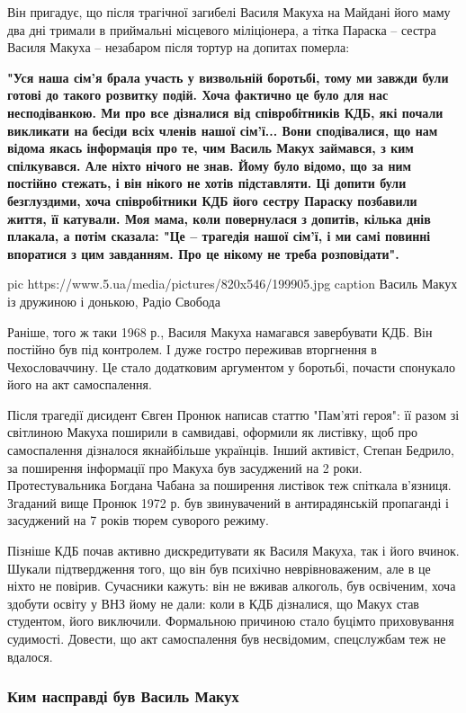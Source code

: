 Він пригадує, що після трагічної загибелі Василя Макуха на Майдані його
маму два дні тримали в приймальні місцевого міліціонера, а тітка Параска –
сестра Василя Макуха – незабаром після тортур на допитах померла:

{\bfseries
"Уся наша сім'я брала участь у визвольній боротьбі, тому ми завжди були
готові до такого розвитку подій. Хоча фактично це було для нас
несподіванкою. Ми про все дізналися від співробітників КДБ, які почали
викликати на бесіди всіх членів нашої сім'ї... Вони сподівалися, що нам
відома якась інформація про те, чим Василь Макух займався, з ким
спілкувався. Але ніхто нічого не знав. Йому було відомо, що за ним
постійно стежать, і він нікого не хотів підставляти. Ці допити були
безглуздими, хоча співробітники КДБ його сестру Параску позбавили життя,
її катували. Моя мама, коли повернулася з допитів, кілька днів плакала,
а потім сказала: "Це – трагедія нашої сім'ї, і ми самі повинні впоратися
з цим завданням. Про це нікому не треба розповідати".
}

\ifcmt
pic https://www.5.ua/media/pictures/820x546/199905.jpg
caption Василь Макух із дружиною і донькою, Радіо Свобода
\fi

Раніше, того ж таки 1968 р., Василя Макуха намагався завербувати КДБ. Він
постійно був під контролем. І дуже гостро переживав вторгнення в
Чехословаччину. Це стало додатковим аргументом у боротьбі, почасти
спонукало його на акт самоспалення.

Після трагедії дисидент Євген Пронюк написав статтю "Пам'яті героя": її
разом зі світлиною Макуха поширили в самвидаві, оформили як листівку, щоб
про самоспалення дізналося якнайбільше українців. Інший активіст, Степан
Бедрило, за поширення інформації про Макуха був засуджений на 2 роки.
Протестувальника Богдана Чабана за поширення листівок теж спіткала
в'язниця. Згаданий вище Пронюк 1972 р. був звинувачений в антирадянській
пропаганді і засуджений на 7 років тюрем суворого режиму.

Пізніше КДБ почав активно дискредитувати як Василя Макуха, так і його
вчинок. Шукали підтвердження того, що він був психічно неврівноваженим,
але в це ніхто не повірив. Сучасники кажуть: він не вживав алкоголь, був
освіченим, хоча здобути освіту у ВНЗ йому не дали: коли в КДБ дізналися,
що Макух став студентом, його виключили. Формальною причиною стало буцімто
приховування судимості. Довести, що акт самоспалення був несвідомим,
спецслужбам теж не вдалося.

\subsubsection{Ким насправді був Василь Макух}

